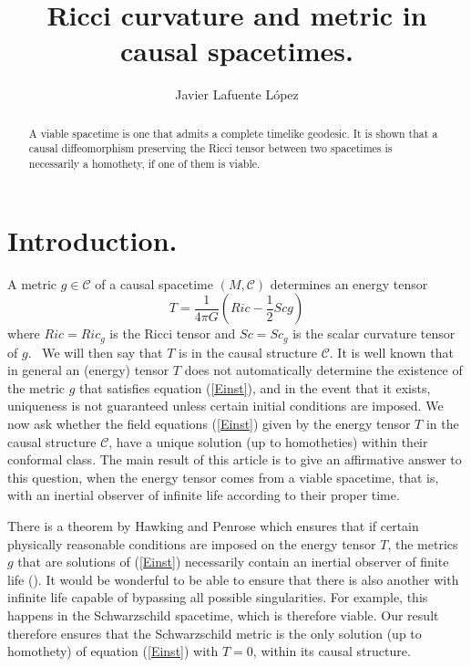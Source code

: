 \documentclass{amsart}%
\theoremstyle{plain}
\numberwithin{equation}{section}
\begin{document}
\title{Ricci curvature and metric in causal spacetimes.}
\author{Javier Lafuente L\'{o}pez}
\address{Dpto. de \'{A}lgebra, Geometr\'{\i}a y Topolog\'{\i}a.\\
Universidad Complutense de Madrid. \\
Avda. Complutense s/n Madrid 28040 Spain}
\maketitle

\begin{abstract}
A viable spacetime is one that admits a complete timelike geodesic. It is
shown that a causal diffeomorphism preserving the Ricci tensor between two
spacetimes is necessarily a homothety, if one of them is viable.

\end{abstract}


\section{Introduction.}

A metric $g\in\mathcal{C}$ of a causal spacetime $\left(  M,\mathcal{C}%
\right)  $ determines an energy tensor
\begin{equation}
T=\frac{1}{4\pi G}\left(  Ric-\frac{1}{2}Scg\right)  \label{Einst}%
\end{equation}
where $Ric=Ric_{g}$ is the Ricci tensor and $Sc=Sc_{g}$ is the scalar
curvature tensor of $g$. \ We will then say that $T$ is in the causal
structure $\mathcal{C}$. It is well known that in general an (energy) tensor
$T$ does not automatically determine the existence of the metric $g$ that
satisfies equation (\ref{Einst}), and in the event that it exists, uniqueness
is not guaranteed unless certain initial conditions are imposed. We now ask
whether the field equations (\ref{Einst}) given by the energy tensor $T$ in
the causal structure $\mathcal{C}$, have a unique solution (up to homotheties)
within their conformal class. The main result of this article is to give an
affirmative answer to this question, when the energy tensor comes from a
viable spacetime, that is, with an inertial observer of infinite life
according to their proper time. 

There is a theorem by Hawking and Penrose which ensures that if certain
physically reasonable conditions are imposed on the energy tensor $T$, the
metrics $g$ that are solutions of (\ref{Einst}) necessarily contain an
inertial observer of finite life (\cite{Pen}\cite{Hawk1}\cite{Hawk2}). It
would be wonderful to be able to ensure that there is also another with
infinite life capable of bypassing all possible singularities. For example,
this happens in the Schwarzschild spacetime, which is therefore viable. Our
result therefore ensures that the Schwarzschild metric is the only solution
(up to homothety) of equation (\ref{Einst}) with $T=0$, within its causal
structure. 
\end{document}
